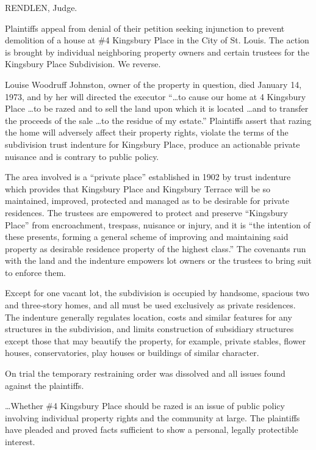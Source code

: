 
RENDLEN, Judge.

Plaintiffs appeal from denial of their petition seeking injunction to prevent
demolition of a house at \#4 Kingsbury Place in the City of St. Louis. The
action is brought by individual neighboring property owners and certain
trustees for the Kingsbury Place Subdivision. We reverse.

Louise Woodruff Johnston, owner of the property in question, died January 14,
1973, and by her will directed the executor ``\ldots to cause our home at 4
Kingsbury Place \ldots to be razed and to sell the land upon which it is located
\ldots and to transfer the proceeds of the sale \ldots to the residue of my
estate.'' Plaintiffs assert that razing the home will adversely affect their
property rights, violate the terms of the subdivision trust indenture for
Kingsbury Place, produce an actionable private nuisance and is contrary to
public policy.

The area involved is a ``private place'' established in 1902 by trust indenture
which provides that Kingsbury Place and Kingsbury Terrace will be so
maintained, improved, protected and managed as to be desirable for private
residences. The trustees are empowered to protect and preserve ``Kingsbury
Place'' from encroachment, trespass, nuisance or injury, and it is ``the
intention of these presents, forming a general scheme of improving and
maintaining said property as desirable residence property of the highest
class.'' The covenants run with the land and the indenture empowers lot owners
or the trustees to bring suit to enforce them.

Except for one vacant lot, the subdivision is occupied by handsome, spacious two
and three-story homes, and all must be used exclusively as private residences.
The indenture generally regulates location, costs and similar features for any
structures in the subdivision, and limits construction of subsidiary structures
except those that may beautify the property, for example, private stables,
flower houses, conservatories, play houses or buildings of similar character.

On trial the temporary restraining order was dissolved and all issues found
against the plaintiffs.

\ldots Whether \#4 Kingsbury Place should be razed is an issue of public policy
involving individual property rights and the community at large. The plaintiffs
have pleaded and proved facts sufficient to show a personal, legally
protectible interest.

